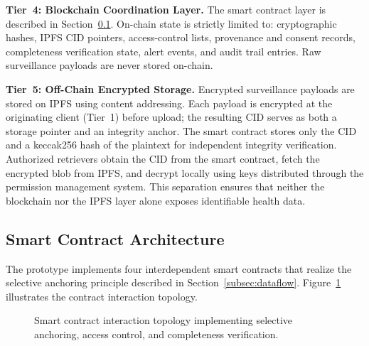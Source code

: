\documentclass[AMA,LATO1COL]{WileyNJD-v2}
\begin{document}
\textbf{Tier~4: Blockchain Coordination Layer.} The smart contract layer is described in Section~\ref{subsec:contracts}. On-chain state is strictly limited to: cryptographic hashes, IPFS CID pointers, access-control lists, provenance and consent records, completeness verification state, alert events, and audit trail entries. Raw surveillance payloads are never stored on-chain.

\textbf{Tier~5: Off-Chain Encrypted Storage.} Encrypted surveillance payloads are stored on IPFS using content addressing. Each payload is encrypted at the originating client (Tier~1) before upload; the resulting CID serves as both a storage pointer and an integrity anchor. The smart contract stores only the CID and a keccak256 hash of the plaintext for independent integrity verification. Authorized retrievers obtain the CID from the smart contract, fetch the encrypted blob from IPFS, and decrypt locally using keys distributed through the permission management system. This separation ensures that neither the blockchain nor the IPFS layer alone exposes identifiable health data.

\subsection{Smart Contract Architecture}\label{subsec:contracts}

The prototype implements four interdependent smart contracts that realize the selective anchoring principle described in Section~\ref{subsec:dataflow}. Figure~\ref{fig:contracts} illustrates the contract interaction topology.

\begin{figure}[!ht]
\centering
{}
\caption{Smart contract interaction topology implementing selective anchoring, access control, and completeness verification.}\label{fig:contracts}
\end{figure}
\end{document}
